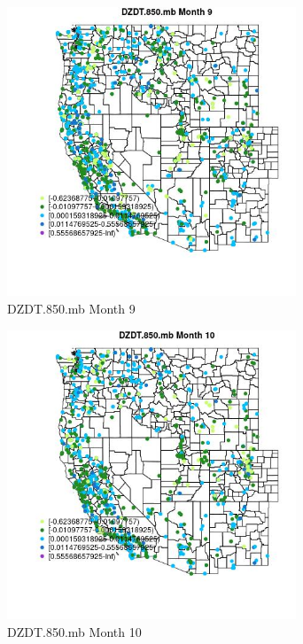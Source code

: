 \begin{figure} 
\centering  
\includegraphics[width=0.77\textwidth]{Code_Outputs/Report_ML_input_PM25_Step4_part_f_de_duplicated_aveswNAs_MapObsMo9DZDT850mb.jpg} 
\caption{\label{fig:Report_ML_input_PM25_Step4_part_f_de_duplicated_aveswNAsMapObsMo9DZDT850mb}DZDT.850.mb Month 9} 
\end{figure} 
 

\begin{figure} 
\centering  
\includegraphics[width=0.77\textwidth]{Code_Outputs/Report_ML_input_PM25_Step4_part_f_de_duplicated_aveswNAs_MapObsMo10DZDT850mb.jpg} 
\caption{\label{fig:Report_ML_input_PM25_Step4_part_f_de_duplicated_aveswNAsMapObsMo10DZDT850mb}DZDT.850.mb Month 10} 
\end{figure} 
 

